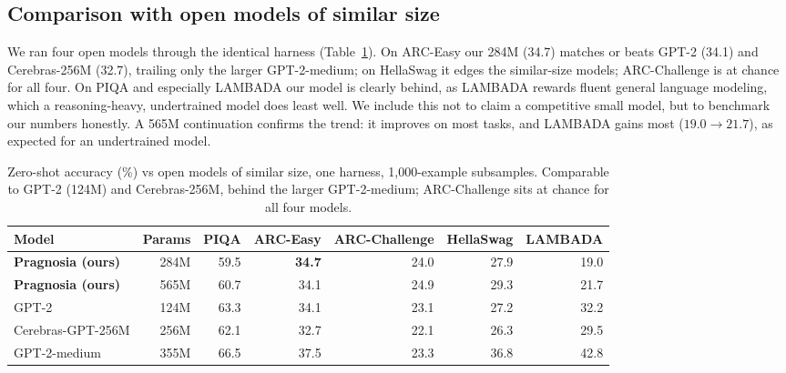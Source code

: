 \documentclass[10pt,twocolumn]{article}
\begin{document}
\begin{table}[t]\centering\small
\caption{Zero-shot public benchmarks (1{,}000-example subsamples; acc\_norm = length-normalized log-likelihood).}
\label{tab:bench}
\end{table}

\subsection{Comparison with open models of similar size}
We ran four open models through the identical harness (Table~\ref{tab:open}). On ARC-Easy our 284M (34.7) matches or beats GPT-2 (34.1) and Cerebras-256M (32.7), trailing only the larger GPT-2-medium; on HellaSwag it edges the similar-size models; ARC-Challenge is at chance for all four. On PIQA and especially LAMBADA our model is clearly behind, as LAMBADA rewards fluent general language modeling, which a reasoning-heavy, undertrained model does least well. We include this not to claim a competitive small model, but to benchmark our numbers honestly. A 565M continuation confirms the trend: it improves on most tasks, and LAMBADA gains most ($19.0\to21.7$), as expected for an undertrained model.

\begin{table}[t]\centering\small\caption{Zero-shot accuracy (\%) vs open models of similar size, one harness, 1{,}000-example subsamples. Comparable to GPT-2 (124M) and Cerebras-256M, behind the larger GPT-2-medium; ARC-Challenge sits at chance for all four models.}
\label{tab:open}
\begin{tabular}{@{}l r r r r r r@{}}
\toprule
Model & Params & PIQA & ARC-Easy & ARC-Challenge & HellaSwag & LAMBADA \\
\midrule
\textbf{Pragnosia (ours)} & 284M & 59.5 & \textbf{34.7} & 24.0 & 27.9 & 19.0 \\
\textbf{Pragnosia (ours)} & 565M & 60.7 & 34.1 & 24.9 & 29.3 & 21.7 \\
GPT-2 & 124M & 63.3 & 34.1 & 23.1 & 27.2 & 32.2 \\
Cerebras-GPT-256M & 256M & 62.1 & 32.7 & 22.1 & 26.3 & 29.5 \\
GPT-2-medium & 355M & 66.5 & 37.5 & 23.3 & 36.8 & 42.8 \\
\bottomrule
\end{tabular}
\end{table}
\end{document}
